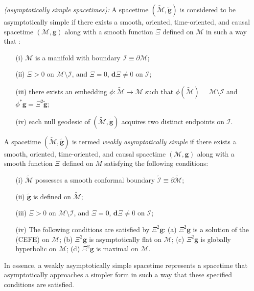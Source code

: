 \begin{mydefinition}\label{def:asymptoticallysimple}
  \textit{(asymptotically simple spacetimes):} A spacetime $(\tilde{\mathcal{M}}, \boldsymbol{\tilde{g}})$ is considered to be asymptotically simple if there exists a smooth, oriented, time-oriented, and causal spacetime  $({\mathcal{M}},\boldsymbol{g})$ along with a smooth function $\Xi$ defined on $\mathcal{M}$ in such a way that \cite{Ste91}:
  \begin{enumerate}
    \item[(i)] $\mathcal{M}$ is a manifold with boundary $\mathcal{I} \equiv \partial \mathcal{M}$;
    \item[(ii)] $\Xi > 0$ on $\mathcal{M} \setminus \mathcal{I}$, and $\Xi = 0$, $\boldsymbol{d}\Xi \neq 0$ on $\mathcal{I}$;
    \item[(iii)] there exists an embedding $\phi: \mathcal{\tilde{M}} \rightarrow \mathcal{M}$ such that $\phi(\tilde{\mathcal{M}}) = \mathcal{M}\setminus \mathcal{I}$ and $\phi^{*}\boldsymbol{g} = \Xi^{2}\boldsymbol{\tilde{g}}$;
    \item[(iv)] each null geodesic of $(\mathcal{\tilde{M}}, \boldsymbol{\tilde{g}})$ acquires two distinct endpoints on $\mathcal{I}$.
  \end{enumerate}
\end{mydefinition}

\begin{mydefinition}\label{def:weaklyasymptoticallysimple}
  A spacetime $(\tilde{\mathcal{M}}, \boldsymbol{\tilde{g}})$ is termed \textit{weakly asymptotically simple} if there exists a smooth, oriented, time-oriented, and causal spacetime $(\mathcal{M}, \boldsymbol{g})$ along with a smooth function $\Xi$ defined on $M$ satisfying the following conditions:
  \begin{enumerate}
    \item[(i)] $\tilde{\mathcal{M}}$ possesses a smooth conformal boundary $\tilde{\mathcal{I}} \equiv \partial \tilde{\mathcal{M}}$;
    \item[(ii)] $ \boldsymbol{\tilde{g}}$ is defined on $\tilde{\mathcal{M}}$;
    \item[(iii)] $\Xi > 0$ on $\mathcal{M} \setminus \mathcal{I}$, and $\Xi = 0$, $\boldsymbol{d}\Xi \neq 0$ on $\mathcal{I}$;
    \item[(iv)] The following conditions are satisfied by $\Xi^{2}\boldsymbol{g}$:
     \subitem(a) $\Xi^{2}\boldsymbol{g}$ is a solution of the (CEFE) on $\mathcal{M}$;
     \subitem (b) $\Xi^{2}\boldsymbol{g}$ is asymptotically flat on $\mathcal{M}$;
     \subitem (c)  $\Xi^{2}\boldsymbol{g}$ is globally hyperbolic on $\mathcal{M}$;
     \subitem (d)  $\Xi^{2}\boldsymbol{g}$ is maximal on $\mathcal{M}$.
  \end{enumerate}
\end{mydefinition}
In essence, a weakly asymptotically simple spacetime represents a spacetime that asymptotically approaches a simpler form in such a way that these specified conditions are satisfied.\\


